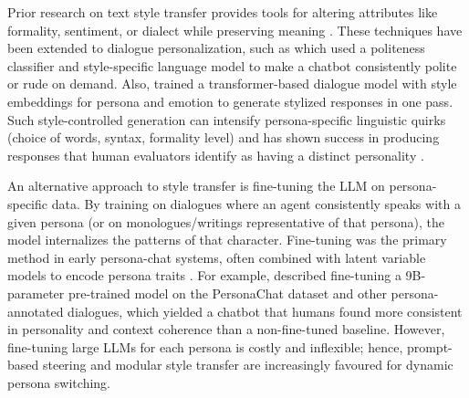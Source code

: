 Prior research on text style transfer provides tools for altering attributes like formality, sentiment, or dialect while preserving meaning \cite{niu-bansal-2018-polite, sudhakar-etal-2019-transforming}. These techniques have been extended to dialogue personalization, such as \cite{niu-bansal-2018-polite} which used a politeness classifier and style-specific language model to make a chatbot consistently polite or rude on demand.  Also, \cite{zhong-etal-2021-stylized} trained a transformer-based dialogue model with style embeddings for persona and emotion to generate stylized responses in one pass. Such style-controlled generation can intensify persona-specific linguistic quirks (choice of words, syntax, formality level) and has shown success in producing responses that human evaluators identify as having a distinct personality \cite{zhong-etal-2021-stylized}.

An alternative approach to style transfer is fine-tuning the LLM on persona-specific data. By training on dialogues where an agent consistently speaks with a given persona (or on monologues/writings representative of that persona), the model internalizes the patterns of that character. Fine-tuning was the primary method in early persona-chat systems, often combined with latent variable models to encode persona traits \cite{li-etal-2016-persona}. For example, \cite{roller-etal-2021-recipes} described fine-tuning a 9B-parameter pre-trained model on the PersonaChat dataset and other persona-annotated dialogues, which yielded a chatbot that humans found more consistent in personality and context coherence than a non-fine-tuned baseline. However, fine-tuning large LLMs for each persona is costly and inflexible; hence, prompt-based steering and modular style transfer are increasingly favoured for dynamic persona switching.


